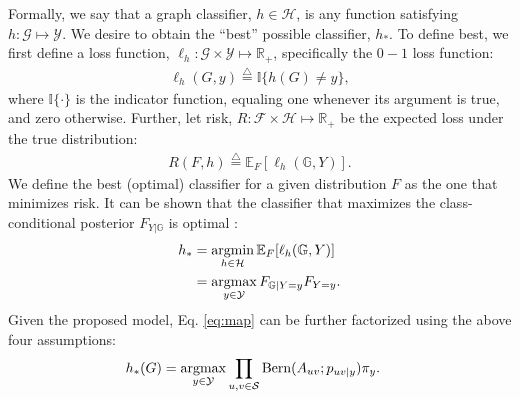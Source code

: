 \documentclass[10pt,journal,cspaper,compsoc]{IEEEtran}
\newcommand{\argmax}{\operatornamewithlimits{argmax}}
\newcommand{\argmin}{\operatornamewithlimits{argmin}}
\newcommand{\GG}{\mathbb{G}}
\newcommand{\EE}{\mathbb{E}}           %
\newcommand{\II}{\mathbb{I}}           %
\providecommand{\mc}[1]{\mathcal{#1}}
\newcommand{\Real}{\mathbb{R}}
\newcommand{\defeq}{\overset{\triangle}{=}}
\begin{document}
Formally, we say that a graph classifier, $h \in \mc{H}$, is any function satisfying $h: \mc{G} \mapsto \mc{Y}$.  We desire to obtain the ``best'' possible classifier, $h_*$. To define best, we first define a loss function, $\ell_h: \mc{G} \times \mc{Y} \mapsto \Real_+$, specifically the $0-1$ loss function:
\begin{align}
\ell_h(G,y) \defeq \II \{h(G) \neq y\}, %
\end{align}
where $\II\{\cdot\}$ is the indicator function, equaling one whenever its argument is true, and zero otherwise.  Further, let risk, $R: \mc{F} \times \mc{H} \mapsto \Real_+$ be the expected loss under the true distribution:
\begin{align}
R(F,h) \defeq \EE_F[\ell_h(\GG,Y)].
\end{align}
We define the best (optimal) classifier for a given distribution $F$ as the one that minimizes risk.
It can be shown that the classifier that maximizes the class-conditional posterior $F_{Y | \GG}$ is optimal \cite{Bickel2000}:
\begin{align} \label{eq:map}
h_* &= \argmin_{h \in \mc{H}} \EE_F[\ell_h (\GG,Y)] %
\nonumber \\ &= \argmax_{y \in \mc{Y}} F_{\GG|Y=y} F_{Y=y}.
\end{align}
Given the proposed model, Eq. \eqref{eq:map} can be further factorized using the above four assumptions:
\begin{align}
h_*(G)
&= \argmax_{y \in \mc{Y}} \prod_{u,v \in \mc{S}} \text{Bern}(A_{uv}; p_{uv|y}) \pi_y.
\end{align}
\end{document}

